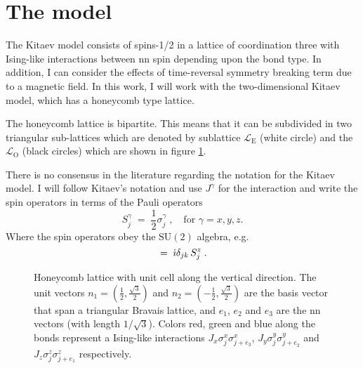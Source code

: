 \section{The model}


The Kitaev model consists of spins-1/2 in a lattice of coordination three with Ising-like interactions between \acrfull{nn} spin depending upon the bond type. In addition, I can consider the effects of time-reversal symmetry breaking term due to a magnetic field. In this work, I will work with the two-dimensional Kitaev model, which has a honeycomb type lattice. 

The honeycomb lattice is bipartite. This means that it can be subdivided in two triangular sub-lattices which are denoted by  sublattice $\mathcal{L}_{\text{E}} $ (white circle) and the   $ \mathcal{L}_{\text{O}}$ (black circles) which are shown in figure \ref{fig:lattice_zigzag}. 




There is no consensus in the literature regarding the notation for the Kitaev model. I will follow Kitaev's notation and use $J^{\gamma}$ for the interaction and write the spin operators in terms of the Pauli operators
\begin{equation}
    S^{\gamma}_j \; = \; \frac{1}{2} \sigma^{\gamma}_{j} \;, \quad  \text{for } \gamma = x,y,z.
\end{equation}
Where the spin operators obey the $\textrm{SU}(2)$ algebra, e.g.
\begin{equation}
    [ \, S^{x}_j , S^{y}_k \, ] \; = \; \im \delta_{jk}  \, S^{z}_j \; .
\end{equation}
\begin{figure}[h]
    \centering
    \scalebox{1.5}{}
    \caption{Honeycomb lattice with unit cell along the vertical direction. The unit vectors $n_1=(\frac{1}{2},\frac{\sqrt{3}}{2})$ and $n_2=(-\frac{1}{2},\frac{\sqrt{3}}{2})$ are the basis vector that span a triangular Bravais lattice, and $e_1$, $e_2$ and $e_3$ are the \acrshort{nn} vectors (with length $1/\sqrt{3}$). Colors red, green and blue along the bonds represent a Ising-like interactions $J_x \sigma^{x}_{j}\sigma^{x}_{j+e_3}$, $J_y\sigma^{y}_{j}\sigma^{y}_{j+e_2}$ and $J_z \sigma^{z}_{j}\sigma^{z}_{j+e_1}$ respectively.
    }
    \label{fig:lattice_zigzag}
\end{figure}


